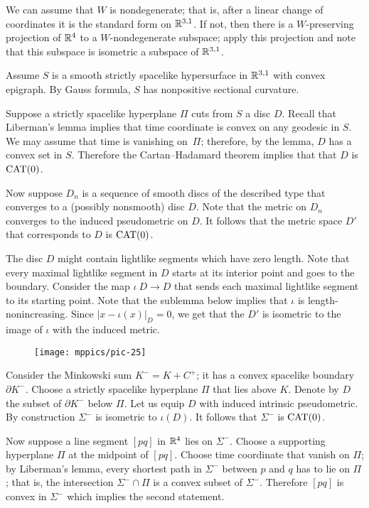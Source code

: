 \documentclass{article}
\begin{document}
We can assume that $W$ is nondegenerate; that is, after a linear change of coordinates it is the standard form on $\mathbb{R}^{3,1}$.
If not, then there is a $W$-preserving projection of $\mathbb{R}^4$ to a $W$-nondegenerate subspace; apply this projection and note that this subspace is isometric a subspace of $\mathbb{R}^{3,1}$.

Assume $S$ is a smooth strictly spacelike hypersurface in $\mathbb{R}^{3,1}$ with convex epigraph.
By Gauss formula, $S$ has nonpositive sectional curvature.

Suppose a strictly spacelike hyperplane $\Pi$ cuts from $S$ a disc $D$.
Recall that Liberman's lemma \cite[Theorem~3]{milka} implies that time coordinate is convex on any geodesic in $S$.
We may assume that time is vanishing on~$\Pi$;
therefore, by the lemma, $D$ has a convex set in $S$.
Therefore the Cartan--Hadamard theorem \cite{alexander-kapovitch-petrunin-2021} implies that that $D$ is $\mathrm{CAT}(0)$.

Now suppose $D_n$ is a sequence of smooth discs of the described type that converges to a (possibly nonsmooth) disc $D$.
Note that the metric on $D_n$ converges to the induced pseudometric on $D$.
It follows that the metric space $D'$ that corresponds to $D$ is $\mathrm{CAT}(0)$.

The disc $D$ might contain lightlike segments which have zero length.
Note that every maximal lightlike segment in $D$ starts at its interior point and goes to the boundary.
Consider the map $\iota\:D\to D$ that sends each maximal lightlike segment to its starting point.
Note that the sublemma below implies that $\iota$ is length-nonincreasing.
Since $|x-\iota(x)|_D=0$, we get that the $D'$ is isometric to the image of $\iota$ with the induced metric.

\begin{wrapfigure}{r}{61mm}
\vskip-0mm
\centering
\texttt{[image: mppics/pic-25]}
\end{wrapfigure}

Consider the Minkowski sum $K^-=K+C^+$;
it has a convex spacelike boundary $\partial K^-$.
Choose a strictly spacelike hyperplane $\Pi$ that lies above $K$.
Denote by $D$ the subset of $\partial K^-$ below $\Pi$.
Let us equip $D$ with induced intrinsic pseudometric.
By construction $\Sigma^-$ is isometric to $\iota(D)$.
It follows that $\Sigma^-$ is $\mathrm{CAT}(0)$. 

Now suppose a line segment $[pq]$ in $\mathbb{R}^4$ 
lies on $\Sigma^-$.
Choose a supporting hyperplane $\Pi$ at the midpoint of $[pq]$.
Choose time coordinate that vanish on $\Pi$;
by Liberman's lemma, every shortest path in $\Sigma^-$ between $p$ and $q$ has to lie on $\Pi$;
that is, the intersection $\Sigma^-\cap \Pi$ is a convex subset of $\Sigma^-$.
Therefore $[pq]$ is convex in $\Sigma^-$ which implies the second statement.
\qeds
\end{document}
